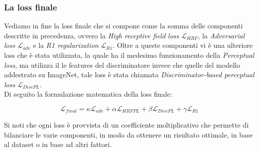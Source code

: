 \subsubsection{La loss finale}
Vediamo in fine la loss finale che si compone come la somma delle componenti descritte in precedenza, ovvero 
la \textit{High receptive field loss} $\mathcal{L}_{HRF}$, la \textit{Adversarial loss} $\mathcal{L}_{adv}$ 
e la \textit{R1 regularization} $\mathcal{L}_{R1}$. Oltre a queste componenti vi è una ulteriore loss che è stata utilizzata,
la quale ha il medesimo funzionamento della \textit{Perceptual loss}, ma utilizza il le features del discriminatore invece che quelle
del modello addestrato su ImageNet, tale loss è stata chiamata \textit{Discriminator-based perceptual loss} $\mathcal{L}_{DiscPL}$.\\
Di seguito la formulazione matematica della loss finale:

\begin{equation}
    \label{eq:final_loss}
    \mathcal{L}_{final} = \kappa \mathcal{L}_{adv} + \alpha \mathcal{L}_{HRFPL} + \beta \mathcal{L}_{DiscPL} + \gamma \mathcal{L}_{R1} 
\end{equation}

Si noti che ogni loss è provvista di un coefficiente moltiplicativo che permette di bilanciare le varie componenti, 
in modo da ottenere un risultato ottimale, in base al dataset o in base ad altri fattori.

